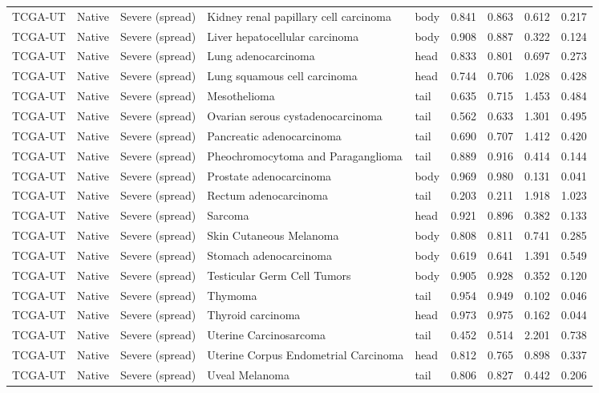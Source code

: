 \begin{longtable}{lllllrrrr}
TCGA-UT & Native & Severe (spread) & Kidney renal papillary cell carcinoma & body & 0.841 & 0.863 & 0.612 & 0.217 \\
TCGA-UT & Native & Severe (spread) & Liver hepatocellular carcinoma & body & 0.908 & 0.887 & 0.322 & 0.124 \\
TCGA-UT & Native & Severe (spread) & Lung adenocarcinoma & head & 0.833 & 0.801 & 0.697 & 0.273 \\
TCGA-UT & Native & Severe (spread) & Lung squamous cell carcinoma & head & 0.744 & 0.706 & 1.028 & 0.428 \\
TCGA-UT & Native & Severe (spread) & Mesothelioma & tail & 0.635 & 0.715 & 1.453 & 0.484 \\
TCGA-UT & Native & Severe (spread) & Ovarian serous cystadenocarcinoma & tail & 0.562 & 0.633 & 1.301 & 0.495 \\
TCGA-UT & Native & Severe (spread) & Pancreatic adenocarcinoma & tail & 0.690 & 0.707 & 1.412 & 0.420 \\
TCGA-UT & Native & Severe (spread) & Pheochromocytoma and Paraganglioma & tail & 0.889 & 0.916 & 0.414 & 0.144 \\
TCGA-UT & Native & Severe (spread) & Prostate adenocarcinoma & body & 0.969 & 0.980 & 0.131 & 0.041 \\
TCGA-UT & Native & Severe (spread) & Rectum adenocarcinoma & tail & 0.203 & 0.211 & 1.918 & 1.023 \\
TCGA-UT & Native & Severe (spread) & Sarcoma & head & 0.921 & 0.896 & 0.382 & 0.133 \\
TCGA-UT & Native & Severe (spread) & Skin Cutaneous Melanoma & body & 0.808 & 0.811 & 0.741 & 0.285 \\
TCGA-UT & Native & Severe (spread) & Stomach adenocarcinoma & body & 0.619 & 0.641 & 1.391 & 0.549 \\
TCGA-UT & Native & Severe (spread) & Testicular Germ Cell Tumors & body & 0.905 & 0.928 & 0.352 & 0.120 \\
TCGA-UT & Native & Severe (spread) & Thymoma & tail & 0.954 & 0.949 & 0.102 & 0.046 \\
TCGA-UT & Native & Severe (spread) & Thyroid carcinoma & head & 0.973 & 0.975 & 0.162 & 0.044 \\
TCGA-UT & Native & Severe (spread) & Uterine Carcinosarcoma & tail & 0.452 & 0.514 & 2.201 & 0.738 \\
TCGA-UT & Native & Severe (spread) & Uterine Corpus Endometrial Carcinoma & head & 0.812 & 0.765 & 0.898 & 0.337 \\
TCGA-UT & Native & Severe (spread) & Uveal Melanoma & tail & 0.806 & 0.827 & 0.442 & 0.206 \\
\end{longtable}
